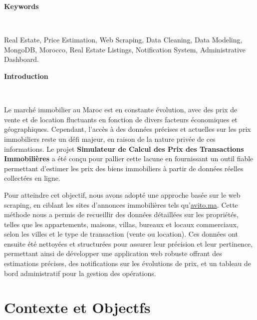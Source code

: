 \documentclass[a4paper,12pt]{report}
\numberwithin{equation}{section}
\begin{document}
\vspace*{3.5cm}
\begin{center}
    {\huge\bfseries Keywords\par} \
\end{center}
{\large Real Estate, Price Estimation, Web Scraping, Data Cleaning, Data Modeling, MongoDB, Morocco, Real Estate Listings, Notification System, Administrative Dashboard.\par}


\newpage

\vspace*{3cm}
\begin{center}
    {\huge\bfseries Introduction\par} \
\end{center}
{\large  
\par Le marché immobilier au Maroc est en constante évolution, avec des prix de vente et de location fluctuants en fonction de divers facteurs économiques et géographiques. Cependant, l'accès à des données précises et actuelles sur les prix immobiliers reste un défi majeur, en raison de la nature privée de ces informations. Le projet \textbf{Simulateur de Calcul des Prix des Transactions Immobilières} a été conçu pour pallier cette lacune en fournissant un outil fiable permettant d'estimer les prix des biens immobiliers à partir de données réelles collectées en ligne. 
\par Pour atteindre cet objectif, nous avons adopté une approche basée sur le web scraping, en ciblant les sites d'annonces immobilières tels qu'\url{avito.ma}. Cette méthode nous a permis de recueillir des données détaillées sur les propriétés, telles que les appartements, maisons, villas, bureaux et locaux commerciaux, selon les villes et le type de transaction (vente ou location). Ces données ont ensuite été nettoyées et structurées pour assurer leur précision et leur pertinence, permettant ainsi de développer une application web robuste offrant des estimations précises, des notifications sur les évolutions de prix, et un tableau de bord administratif pour la gestion des opérations.\par}


\newpage
\chapter{Contexte et Objectfs}
\end{document}
